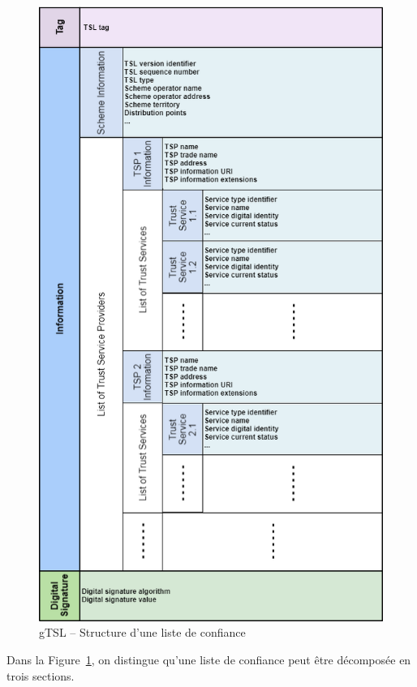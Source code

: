 \documentclass{tnreport}
\begin{document}
\begin{figure}[h]
	\centering
	\includegraphics[scale=0.65]{figures/tsl-scheme}
	\caption{gTSL – Structure d'une liste de confiance}
	\label{fig:tsl-scheme}
\end{figure}

\clearpage

Dans la Figure~\ref{fig:tsl-scheme}, on distingue qu'une liste de confiance peut être décomposée en trois sections. 
\end{document}
